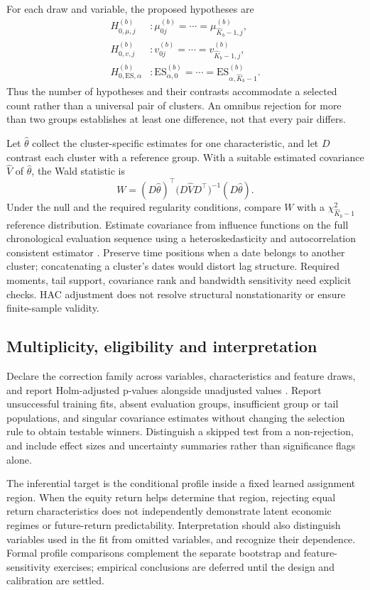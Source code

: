 \documentclass[11pt,a4paper]{article}
\begin{document}
For each draw and variable, the proposed hypotheses are
\begin{align}
H_{0,\mu,j}^{(b)} &: \mu_{0j}^{(b)}=\cdots=\mu_{\widehat K_b-1,j}^{(b)},\\
H_{0,v,j}^{(b)} &: v_{0j}^{(b)}=\cdots=v_{\widehat K_b-1,j}^{(b)},\\
H_{0,\mathrm{ES},\alpha}^{(b)} &: \mathrm{ES}_{\alpha,0}^{(b)}=\cdots=
\mathrm{ES}_{\alpha,\widehat K_b-1}^{(b)}.
\end{align}
Thus the number of hypotheses and their contrasts accommodate a selected count rather than a universal pair of clusters. An omnibus rejection for more than two groups establishes at least one difference, not that every pair differs.

Let $\widehat\theta$ collect the cluster-specific estimates for one characteristic, and let $D$ contrast each cluster with a reference group. With a suitable estimated covariance $\widehat V$ of $\widehat\theta$, the Wald statistic is
\begin{equation}
W=(D\widehat\theta)^\top
\bigl(D\widehat V D^\top\bigr)^{-1}
(D\widehat\theta).
\end{equation}
Under the null and the required regularity conditions, compare $W$ with a $\chi^2_{\widehat K_b-1}$ reference distribution. Estimate covariance from influence functions on the full chronological evaluation sequence using a heteroskedasticity and autocorrelation consistent estimator \cite{neweywest1987}. Preserve time positions when a date belongs to another cluster; concatenating a cluster's dates would distort lag structure. Required moments, tail support, covariance rank and bandwidth sensitivity need explicit checks. HAC adjustment does not resolve structural nonstationarity or ensure finite-sample validity.

\subsection{Multiplicity, eligibility and interpretation}

Declare the correction family across variables, characteristics and feature draws, and report Holm-adjusted p-values alongside unadjusted values \cite{holm1979}. Report unsuccessful training fits, absent evaluation groups, insufficient group or tail populations, and singular covariance estimates without changing the selection rule to obtain testable winners. Distinguish a skipped test from a non-rejection, and include effect sizes and uncertainty summaries rather than significance flags alone.

The inferential target is the conditional profile inside a fixed learned assignment region. When the equity return helps determine that region, rejecting equal return characteristics does not independently demonstrate latent economic regimes or future-return predictability. Interpretation should also distinguish variables used in the fit from omitted variables, and recognize their dependence. Formal profile comparisons complement the separate bootstrap and feature-sensitivity exercises; empirical conclusions are deferred until the design and calibration are settled.
\end{document}
